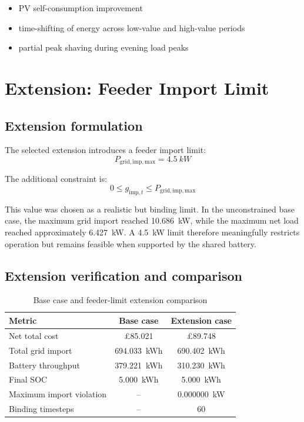 \documentclass[12pt,a4paper]{article}
\begin{document}
\begin{itemize}
    \item PV self-consumption improvement
    \item time-shifting of energy across low-value and high-value periods
    \item partial peak shaving during evening load peaks
\end{itemize}

\section{Extension: Feeder Import Limit}

\subsection{Extension formulation}

The selected extension introduces a feeder import limit:
\[
P_{\mathrm{grid,imp,max}} = \SI{4.5}{kW}
\]

The additional constraint is:
\[
0 \le g_{\mathrm{imp},t} \le P_{\mathrm{grid,imp,max}}
\]

This value was chosen as a realistic but binding limit. In the unconstrained base case, the maximum grid import reached \SI{10.686}{kW}, while the maximum net load reached approximately \SI{6.427}{kW}. A \SI{4.5}{kW} limit therefore meaningfully restricts operation but remains feasible when supported by the shared battery.

\subsection{Extension verification and comparison}

\begin{table}[H]
\centering
\caption{Base case and feeder-limit extension comparison}
\begin{tabular}{lcc}
\toprule
Metric & Base case & Extension case \\
\midrule
Net total cost & \pounds 85.021 & \pounds 89.748 \\
Total grid import & \SI{694.033}{kWh} & \SI{690.402}{kWh} \\
Battery throughput & \SI{379.221}{kWh} & \SI{310.230}{kWh} \\
Final SOC & \SI{5.000}{kWh} & \SI{5.000}{kWh} \\
Maximum import violation & -- & \SI{0.000000}{kW} \\
Binding timesteps & -- & 60 \\
\bottomrule
\end{tabular}
\end{table}
\end{document}
